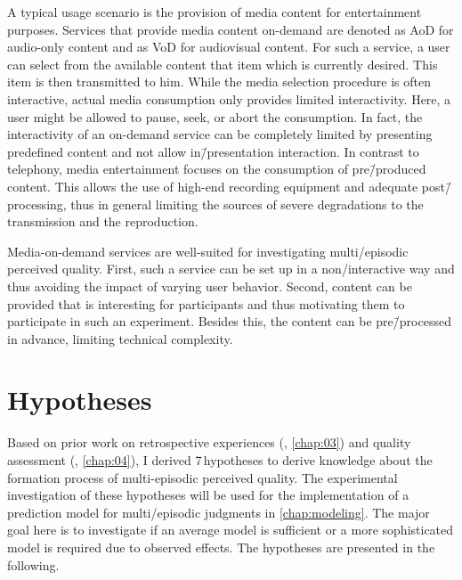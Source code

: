 A typical usage scenario is the provision of media content for entertainment purposes.
Services that provide media content on-demand are denoted as \acf{AoD} for audio-only content and as \acf{VoD} for audiovisual content.
For such a service, a user can select from the available content that item which is currently desired.
This item is then transmitted to him.
While the media selection procedure is often interactive, actual media consumption only provides limited interactivity.
Here, a user might be allowed to pause, seek, or abort the consumption.
In fact, the interactivity of an on-demand service can be completely limited by presenting predefined content and not allow in\=/presentation interaction.
In contrast to telephony, media entertainment focuses on the consumption of pre\=/produced content.
This allows the use of high-end recording equipment and adequate post\=/processing, thus in general limiting the sources of severe degradations to the transmission and the reproduction.

Media-on-demand services are well-suited for investigating multi\-/episodic perceived quality.
First, such a service can be set up in a non\-/interactive way and thus avoiding the impact of varying user behavior.
Second, content can be provided that is interesting for participants and thus motivating them to participate in such an experiment.
Besides this, the content can be pre\=/processed in advance, limiting technical complexity.

\section{Hypotheses}
Based on prior work on retrospective experiences (\cf, \autoref{chap:03}) and quality assessment (\cf, \autoref{chap:04}), I derived 7\,hypotheses to derive knowledge about the formation process of multi-episodic perceived quality.
The experimental investigation of these hypotheses will be used for the implementation of a prediction model for multi\-/episodic judgments in \autoref{chap:modeling}.
The major goal here is to investigate if an average model is sufficient or a more sophisticated model is required due to observed effects.
The hypotheses are presented in the following.


